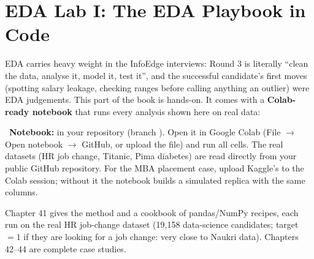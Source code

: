 \chapter{EDA Lab I: The EDA Playbook in Code}

EDA carries heavy weight in the InfoEdge interviews: Round 3 is literally ``clean the data, analyse it, model it, test it'', and the
successful candidate's first moves (spotting salary leakage, checking ranges before calling anything an outlier) were EDA judgements. This part of the
book is hands-on. It comes with a \textbf{Colab-ready notebook} that runs every analysis shown here on real data:
\begin{tcolorbox}[colback=accentlight,colframe=accent,boxrule=0.5pt,arc=2pt]
\small\faLaptopCode\ \textbf{Notebook:}  in your repository (branch
). Open it in Google Colab (File $\to$ Open notebook $\to$ GitHub, or upload the file) and run all cells. The real
datasets (HR job change, Titanic, Pima diabetes) are read directly from your public GitHub repository. For the MBA placement case, upload Kaggle's
 to the Colab session; without it the notebook builds a simulated replica with the same columns.
\end{tcolorbox}
Chapter 41 gives the method and a cookbook of pandas/NumPy recipes, each run on the real HR job-change dataset (19{,}158 data-science candidates; target
$=1$ if they are looking for a job change: very close to Naukri data). Chapters 42--44 are complete case studies.

